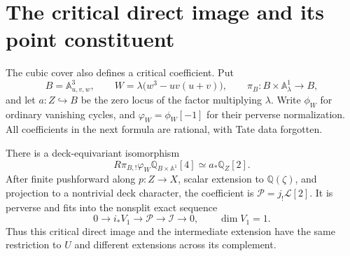 \section{The critical direct image and its point constituent}
\label{cycoll:sec:critical}

The cubic cover also defines a critical coefficient. Put
\[
 B=\mathbb A^3_{u,v,w},\qquad
 W=\lambda\bigl(w^3-uv(u+v)\bigr),\qquad
 \pi_B:B\times\mathbb A^1_\lambda\longrightarrow B,
\]
and let $a:Z\hookrightarrow B$ be the zero locus of the
factor multiplying $\lambda$. Write $\phi_W$ for ordinary
vanishing cycles, and $\varphi_W=\phi_W[-1]$ for their
perverse normalization. All coefficients in the next formula
are rational, with Tate data forgotten.

\begin{theorem}\label{cycoll:thm:critical}
There is a deck-equivariant isomorphism
\begin{equation}\label{cycoll:eq:dimensional-reduction}
 R\pi_{B,!}\varphi_W\mathbb Q_{B\times\mathbb A^1}[4]
       \simeq a_*\mathbb Q_Z[2].
\end{equation}
After finite pushforward along $p:Z\to X$, scalar extension to
$\mathbb Q(\zeta)$, and projection to
a nontrivial deck character, the coefficient is
$\mathcal P=j_!\mathcal L[2]$. It is perverse and fits into
the nonsplit exact sequence
\begin{equation}\label{cycoll:eq:point-extension}
 0\longrightarrow i_*V_1\longrightarrow\mathcal P
       \longrightarrow\mathcal I\longrightarrow0,
 \qquad \dim V_1=1.
\end{equation}
Thus this critical direct image and the intermediate extension
have the same restriction to $U$ and different extensions
across its complement.
\end{theorem}
